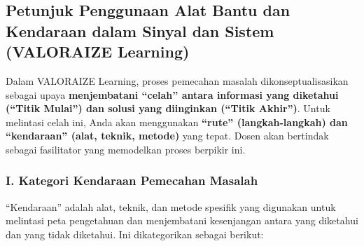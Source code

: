 \documentclass[
  letterpaper,
  DIV=11,
  numbers=noendperiod]{scrreprt}
\begin{document}
\subsection{\texorpdfstring{\textbf{Petunjuk Penggunaan Alat Bantu dan
Kendaraan dalam Sinyal dan Sistem (VALORAIZE
Learning)}}{Petunjuk Penggunaan Alat Bantu dan Kendaraan dalam Sinyal dan Sistem (VALORAIZE Learning)}}\label{petunjuk-penggunaan-alat-bantu-dan-kendaraan-dalam-sinyal-dan-sistem-valoraize-learning}

Dalam VALORAIZE Learning, proses pemecahan masalah dikonseptualisasikan
sebagai upaya \textbf{menjembatani ``celah'' antara informasi yang
diketahui (``Titik Mulai'') dan solusi yang diinginkan (``Titik
Akhir'')}. Untuk melintasi celah ini, Anda akan menggunakan
\textbf{``rute'' (langkah-langkah) dan ``kendaraan'' (alat, teknik,
metode)} yang tepat. Dosen akan bertindak sebagai fasilitator yang
memodelkan proses berpikir ini.

\subsubsection{\texorpdfstring{\textbf{I. Kategori Kendaraan Pemecahan
Masalah}}{I. Kategori Kendaraan Pemecahan Masalah}}\label{i.-kategori-kendaraan-pemecahan-masalah}

``Kendaraan'' adalah alat, teknik, dan metode spesifik yang digunakan
untuk melintasi peta pengetahuan dan menjembatani kesenjangan antara
yang diketahui dan yang tidak diketahui. Ini dikategorikan sebagai
berikut:
\end{document}
